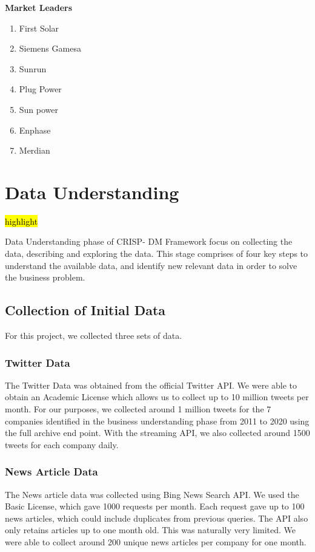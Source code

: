 \documentclass[sigconf, nonacm]{acmart}
\begin{document}
\textbf{Market Leaders }
\begin{enumerate}
    \item First Solar
    \item Siemens Gamesa
    \item Sunrun
    \item Plug Power
    \item Sun power 
    \item Enphase 
    \item Merdian 
\end{enumerate}





\section{Data Understanding}
\hl{highlight}

Data Understanding phase of CRISP- DM Framework focus on collecting the data, describing and exploring the data.
This stage comprises of four key steps to understand the available data, and identify new relevant data in order to solve the business problem. 




\subsection{Collection of Initial Data} %
For this project, we collected three sets of data.

\subsubsection{Twitter Data}
The Twitter Data was obtained from the official Twitter API. We were able to obtain an Academic License which allows us to collect up to 10 million tweets per month. For our purposes, we collected around 1 million tweets for the 7 companies identified in the business understanding phase from 2011 to 2020 using the full archive end point. With the streaming API, we also collected around 1500 tweets for each company daily.

\subsubsection{News Article Data}
The News article data was collected using Bing News Search API. We used the Basic License, which gave 1000 requests per month. Each request gave up to 100 news articles, which could include duplicates from previous queries. The API also only retains articles up to one month old. This was naturally very limited. We were able to collect around 200 unique news articles per company for one month.
\end{document}
